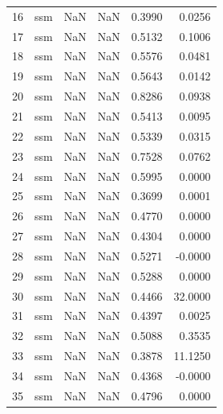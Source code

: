 \begin{tabular}{rlrrrr}
16 & ssm & NaN & NaN & 0.3990 & 0.0256 \\
17 & ssm & NaN & NaN & 0.5132 & 0.1006 \\
18 & ssm & NaN & NaN & 0.5576 & 0.0481 \\
19 & ssm & NaN & NaN & 0.5643 & 0.0142 \\
20 & ssm & NaN & NaN & 0.8286 & 0.0938 \\
21 & ssm & NaN & NaN & 0.5413 & 0.0095 \\
22 & ssm & NaN & NaN & 0.5339 & 0.0315 \\
23 & ssm & NaN & NaN & 0.7528 & 0.0762 \\
24 & ssm & NaN & NaN & 0.5995 & 0.0000 \\
25 & ssm & NaN & NaN & 0.3699 & 0.0001 \\
26 & ssm & NaN & NaN & 0.4770 & 0.0000 \\
27 & ssm & NaN & NaN & 0.4304 & 0.0000 \\
28 & ssm & NaN & NaN & 0.5271 & -0.0000 \\
29 & ssm & NaN & NaN & 0.5288 & 0.0000 \\
30 & ssm & NaN & NaN & 0.4466 & 32.0000 \\
31 & ssm & NaN & NaN & 0.4397 & 0.0025 \\
32 & ssm & NaN & NaN & 0.5088 & 0.3535 \\
33 & ssm & NaN & NaN & 0.3878 & 11.1250 \\
34 & ssm & NaN & NaN & 0.4368 & -0.0000 \\
35 & ssm & NaN & NaN & 0.4796 & 0.0000 \\
\bottomrule
\end{tabular}
